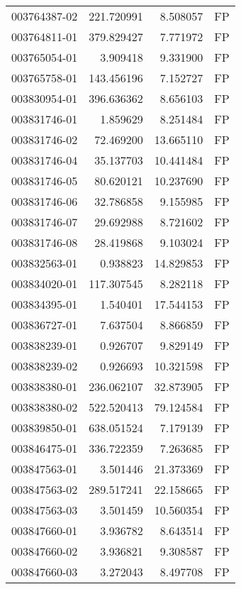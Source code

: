\begin{tabular}{lrrl}
003764387-02 &  221.720991 &       8.508057 &   FP \\
003764811-01 &  379.829427 &       7.771972 &   FP \\
003765054-01 &    3.909418 &       9.331900 &   FP \\
003765758-01 &  143.456196 &       7.152727 &   FP \\
003830954-01 &  396.636362 &       8.656103 &   FP \\
003831746-01 &    1.859629 &       8.251484 &   FP \\
003831746-02 &   72.469200 &      13.665110 &   FP \\
003831746-04 &   35.137703 &      10.441484 &   FP \\
003831746-05 &   80.620121 &      10.237690 &   FP \\
003831746-06 &   32.786858 &       9.155985 &   FP \\
003831746-07 &   29.692988 &       8.721602 &   FP \\
003831746-08 &   28.419868 &       9.103024 &   FP \\
003832563-01 &    0.938823 &      14.829853 &   FP \\
003834020-01 &  117.307545 &       8.282118 &   FP \\
003834395-01 &    1.540401 &      17.544153 &   FP \\
003836727-01 &    7.637504 &       8.866859 &   FP \\
003838239-01 &    0.926707 &       9.829149 &   FP \\
003838239-02 &    0.926693 &      10.321598 &   FP \\
003838380-01 &  236.062107 &      32.873905 &   FP \\
003838380-02 &  522.520413 &      79.124584 &   FP \\
003839850-01 &  638.051524 &       7.179139 &   FP \\
003846475-01 &  336.722359 &       7.263685 &   FP \\
003847563-01 &    3.501446 &      21.373369 &   FP \\
003847563-02 &  289.517241 &      22.158665 &   FP \\
003847563-03 &    3.501459 &      10.560354 &   FP \\
003847660-01 &    3.936782 &       8.643514 &   FP \\
003847660-02 &    3.936821 &       9.308587 &   FP \\
003847660-03 &    3.272043 &       8.497708 &   FP \\

\end{tabular}
